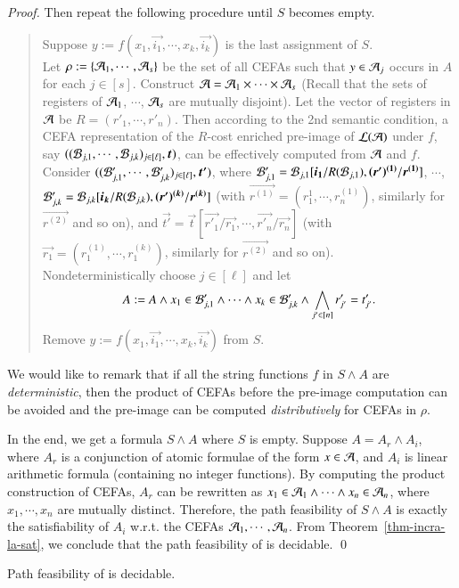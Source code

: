 \begin{proof}
Then repeat the following procedure until $S$ becomes empty.
%
\begin{quote}
Suppose $y := f(x_1, \vec{i_1}, \cdots, x_k, \vec{i_k})$ is the last assignment of $S$. 
\\
Let $\rho := \{\mathcal{A}_1, \cdots, \mathcal{A}_s\}$ be the set of all CEFAs such that $y \in \mathcal{A}_j$ occurs in $A$ for each $j \in [s]$. Construct $\mathcal{A} = \mathcal{A}_1 \times \cdots \times \mathcal{A}_s$ (Recall that the sets of registers of $\mathcal{A}_1$, $\cdots$, $\mathcal{A}_s$ are mutually disjoint). Let  the vector of registers in $\mathcal{A}$ be $R = (r'_1, \cdots, r'_n)$. Then according to the 2nd semantic condition, 
a CEFA representation of the $R$-cost enriched pre-image of $\mathcal{L}(\mathcal{A})$ under $f$, say $((\cB_{j, 1}, \cdots, \cB_{j, k})_{j \in [\ell]}, \vec{t})$, can be effectively computed from $\mathcal{A}$ and $f$. Consider $((\cB'_{j, 1}, \cdots, \cB'_{j, k})_{j \in [\ell]}, \vec{t'})$, where $\cB'_{j, 1} = \cB_{j, 1}[\vec{i_1}/R(\cB_{j,1}), \vec{(r')^{(1)}}/\vec{r^{(1)}}]$, $\cdots$, $\cB'_{j,k}=\cB_{j,k}[\vec{i_k}/R(\cB_{j,k}), \vec{(r')^{(k)}}/\vec{r^{(k)}}]$ (with $\vec{r^{(1)}}= (r^{1}_1, \cdots, r^{(1)}_n)$, similarly for $\vec{r^{(2)}}$ and so on), and $\vec{t'} = \vec{t}[\vec{r'_1}/\vec{r_1}, \cdots, \vec{r'_n}/\vec{r_n}]$ (with $\vec{r_1} = (r^{(1)}_1, \cdots, r^{(k)}_1)$, similarly for $\vec{r^{(2)}}$ and so on). 
\\
Nondeterministically choose $j \in [\ell]$ and let 
$$A:= A \wedge x_1 \in \mathcal{B}'_{j, 1} \wedge \cdots \wedge x_k \in \mathcal{B}'_{j, k}  \wedge \bigwedge \limits_{j' \in [n]} r'_{j'} = t'_{j'}.$$
%
Remove $y := f(x_1, \vec{i_1}, \cdots, x_k, \vec{i_k})$ from $S$.
\end{quote}

We would like to remark that if all the string functions $f$ in $S \wedge A$ are \emph{deterministic}, then the product of CEFAs before the pre-image computation can be avoided and the pre-image can be computed \emph{distributively} for CEFAs in $\rho$.

In the end, we get a formula $S \wedge A$ where $S$ is empty. Suppose $A = A_r \wedge A_i$, where $A_r$ is a conjunction of atomic formulae of the form $x \in \mathcal{A}$, and $A_i$ is linear arithmetic formula (containing no integer functions). By computing the product construction of CEFAs, $A_r$ can be rewritten as $x_1 \in \mathcal{A}_1 \wedge \cdots \wedge x_n \in \mathcal{A}_n$, where $x_1,\cdots, x_n$ are mutually distinct. Therefore, the path feasibility of $S \wedge A$ is exactly the satisfiability of $A_i$ w.r.t. the CEFAs $\mathcal{A}_1, \cdots, \mathcal{A}_n$. From Theorem~\ref{thm-incra-la-sat}, we conclude that the path feasibility of  {\slint} is decidable.
\qed
\end{proof}

\begin{corollary}
Path feasibility of {\cslint} is decidable.
\end{corollary}